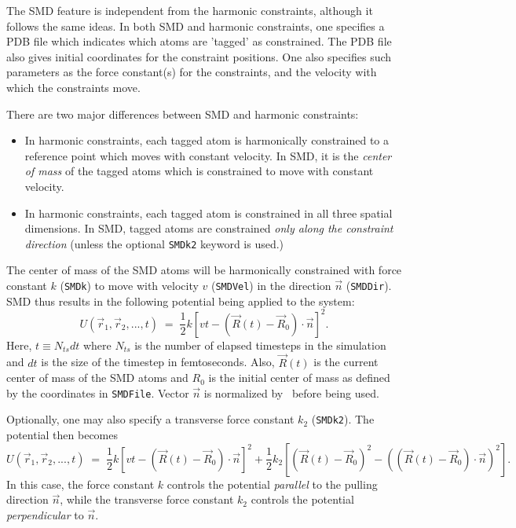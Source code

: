 The SMD feature is independent from the harmonic constraints, although it
follows the same ideas.  In both SMD and harmonic constraints, one specifies
a PDB file which indicates which atoms are 'tagged' as constrained.  The PDB
file also gives initial coordinates for the constraint positions.  One also
specifies such parameters as the force constant(s) for the constraints, 
and the velocity with which the constraints move.  

There are two major differences between SMD and
harmonic constraints:
\begin{itemize}
\item In harmonic constraints, each tagged atom is harmonically constrained
  to a reference point which moves with constant velocity.  In SMD, it is
  the {\em center of mass} of the tagged atoms which is constrained to move
  with constant velocity.

\item In harmonic constraints, each tagged atom is constrained in all three
  spatial dimensions.  In SMD, tagged atoms are constrained {\em only along
  the constraint direction} (unless the optional {\tt SMDk2} keyword is used.)
\end{itemize}

The center of mass of the SMD atoms will be harmonically constrained with 
force constant $k$ ({\tt SMDk}) to move with velocity $v$ ({\tt SMDVel}) in 
the direction $\vec n$ ({\tt SMDDir}).  SMD thus results in the following
potential being applied to the system:
\begin{equation}
\label{eq:SMDpotential}
U(\vec r_1, \vec r_2, ..., t) \; = \; \frac{1}{2} 
  k\left[vt - (\vec R(t) - \vec R_0)\cdot \vec n \right]^2.
\end{equation}
Here, $t \equiv N_{ts} dt$ where $N_{ts}$ is the number of elapsed timesteps
in the simulation and $dt$ is the size of the timestep in femtoseconds.
Also, $\vec R(t)$ is the current center of mass of the SMD atoms and $R_0$ is
the initial center of mass as defined by the coordinates in {\tt SMDFile}.
Vector $\vec n$ is normalized by \NAMD\ before being used.

Optionally, one may also specify a transverse force constant $k_2$ ({\tt SMDk2}).
The potential then becomes
\begin{equation}
\label{eq:SMDpotential2}
U(\vec r_1, \vec r_2, ..., t) \; = \; \frac{1}{2} 
  k\left[vt - (\vec R(t) - \vec R_0)\cdot \vec n \right]^2 + \frac{1}{2}k_2\left[\left(\vec R(t) - \vec R_0\right)^2 - \left((\vec R(t) - \vec R_0) \cdot \vec n\right)^2\right].
\end{equation}
In this case, the force constant $k$ controls the potential \emph{parallel} to the pulling direction $\vec n$, while the transverse force constant $k_2$ controls the potential \emph{perpendicular} to $\vec n$.

